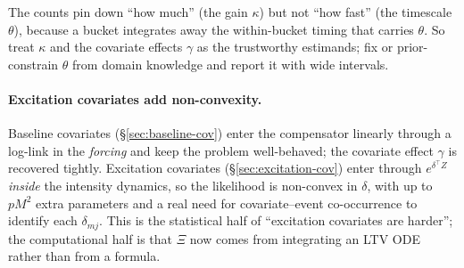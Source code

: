\begin{intuition}
The counts pin down ``how much'' (the gain $\kappa$) but not ``how fast'' (the
timescale $\theta$), because a bucket integrates away the within-bucket timing that
carries $\theta$. So treat $\kappa$ and the covariate effects $\gamma$ as the
trustworthy estimands; fix or prior-constrain $\theta$ from domain knowledge and
report it with wide intervals.
\end{intuition}

\paragraph{Excitation covariates add non-convexity.} Baseline covariates
(\S\ref{sec:baseline-cov}) enter the compensator linearly through a log-link in the
\emph{forcing} and keep the problem well-behaved; the covariate effect $\gamma$ is
recovered tightly. Excitation covariates (\S\ref{sec:excitation-cov}) enter through
$e^{\delta^\top Z}$ \emph{inside} the intensity dynamics, so the likelihood is
non-convex in $\delta$, with up to $pM^2$ extra parameters and a real need for
covariate--event co-occurrence to identify each $\delta_{mj}$. This is the
statistical half of ``excitation covariates are harder''; the computational half is
that $\Xi$ now comes from integrating an LTV ODE rather than from a formula.
